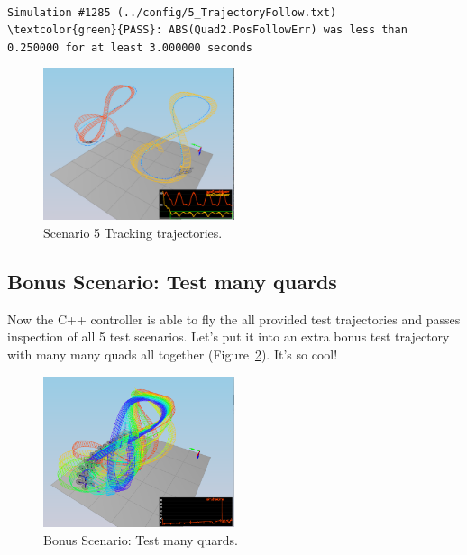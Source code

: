 \documentclass[a4paper]{article}
\begin{document}
\begin{Verbatim}[frame=lines, label=Simulator Test Result Output, commandchars=\\\{\}]

Simulation #1285 (../config/5_TrajectoryFollow.txt)
\textcolor{green}{PASS}: ABS(Quad2.PosFollowErr) was less than 0.250000 for at least 3.000000 seconds
\end{Verbatim}

\begin{figure}[ht]
\centering
\includegraphics[width=0.5\textwidth]{./fig/scenario5.png}
\caption{\label{fig:scenario5} Scenario 5 Tracking trajectories.}
\end{figure}

\subsection{Bonus Scenario: Test many quards}

Now the C++ controller is able to fly the all provided test trajectories and passes inspection of all 5 test scenarios. Let's put it into an extra bonus test trajectory with many many quads all together (Figure~\ref{fig:scenario_test1}). It's so cool! 

\begin{figure}[ht]
\centering
\includegraphics[width=0.5\textwidth]{./fig/scenario_test1.png}
\caption{\label{fig:scenario_test1} Bonus Scenario: Test many quards.}
\end{figure}
\end{document}
